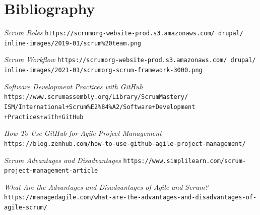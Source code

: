 \documentclass{beamer}
\begin{document}
\section{Bibliography}

\begin{frame}[allowframebreaks]

	\begin{thebibliography}{10}


	\textit{Scrum Roles}
	\texttt{https://scrumorg-website-prod.s3.amazonaws.com/
	drupal/	inline-images/2019-01/scrum\%20team.png}

	\textit{Scrum Workflow}
	\texttt{https://scrumorg-website-prod.s3.amazonaws.com/
	drupal/	inline-images/2021-01/scrumorg-scrum-framework-3000.png}

	\textit{Software Development Practices with GitHub}
	\texttt{https://www.scrumassembly.org/Library/ScrumMastery/\\
	ISM/International+Scrum\%E2\%84\%A2/Software+Development\\
	+Practices+with+GitHub}

	\framebreak

	\textit{How To Use GitHub for Agile Project Management}
	\texttt{https://blog.zenhub.com/how-to-use-github-agile-project-management/}

	\textit{Scrum Advantages and Disadvantages}
	\texttt{https://www.simplilearn.com/scrum-project-management-article}

	\textit{What Are the Advantages and Disadvantages of Agile and Scrum?}
	\texttt{https://managedagile.com/what-are-the-advantages-and-disadvantages-of-agile-scrum/}

	\end{thebibliography}

\end{frame}
\end{document}
